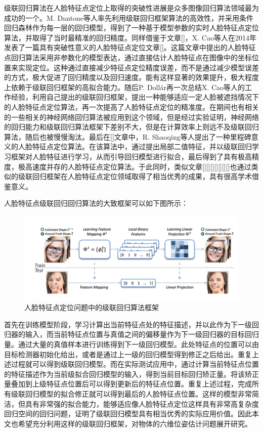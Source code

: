 级联回归算法在人脸特征点定位上取得的突破性进展是众多图像回归算法领域最为成功的一个。M. Dantone等人率先利用级联回归框架算法的高效性，并采用条件回归森林作为每一层的回归模型，得到了一种基于模型参数的实时人脸特征点定位算法，并取得了当时最精准的回归精度。同样借鉴于文章[]，X. Cao等人在2014年发表了一篇具有突破性意义的人脸特征点定位文章[]。这篇文章中提出的人脸特征点回归算法采用非参数化的模型表达，通过直接估计人脸特征点在图像中的坐标位置来实现定位。这种通过直接减少特征点定位精度误差，而不是通过减少模型误差的方式，极大促进了回归精度以及回归速度。能有这样显著的效果提升，极大程度上依赖于级联回归框架的高拟合能力。随后P. Doll{\'a}r再一次总结X. Cao等人的工作经验，利用自己提出的级联回归框架，提出一种能够适应一定人脸被遮挡情况下的人脸特征点定位算法，再一次提高了人脸特征点定位的精准度\cite{burgos2013robust}。在期间也有相关的一些相关的神经网络回归算法被应用到这个领域，但是经过实验证明，神经网络的回归能力和级联回归算法框架下差别不大，但是在计算效率上则远不及级联回归算法\cite{sun2013deep}，随后也被慢慢淘汰。最后在[]文章中，R. Shaoqing等人提出了一种里程碑意义的人脸特征点定位算法。在该算法中，通过提出局部二值特征，并以级联回归学习框架对人脸特征进行学习，从而引导回归模型进行拟合，最后得到了具有极高精度，极高速度并存的人脸特征点定位算法。于此同时，类似文章[][][][][][][]也通过类似的级联回归框架在人脸特征点定位领域取得了相当优秀的成果，具有很高学术借鉴意义。

人脸特征点级联回归回归算法的大致框架可以如下图所示：
\begin{figure}[htb]
	\centering 
	\includegraphics[width=\textwidth]{./mypic/人脸回归算法框架.jpg} 
	\caption{人脸特征点定位问题中的级联回归算法框架} 
\end{figure}
首先在训练模型阶段，学习计算出当前特征点处的特征描述，并以此作为下一级回归器的输入，而当前特征点位置与真值之间的偏移量作为下一级回归器的目标回归量。通过大量的真值样本进行训练得到下一级回归模型。此处特征点的位置可以由目标检测器初始化给出，或者是通过上一级的回归模型得到修正之后给出。重复上述过程就可以得到级联回归模型。而在实际测试应用中，通过计算当前特征点位置的特征描述作为当前级拟合回归模型的输入，得到当前目标回归矫正量。将该矫正量叠加到上级特征点位置后可以得到更新后的特征点位置。重复上述过程，完成所有级联回归模型的拟合修正就可以得到最后的人脸特征点位置。这样的模型非常简洁，但具有非常强的拟合能力，能够适应像人脸特征点定位这样具有非常高复杂度回归空间的回归问题，证明了级联回归模型具有相当优秀的实际应用价值。因此本文也希望充分利用这样的级联回归框架，对物体的六维位姿估计问题展开研究。

